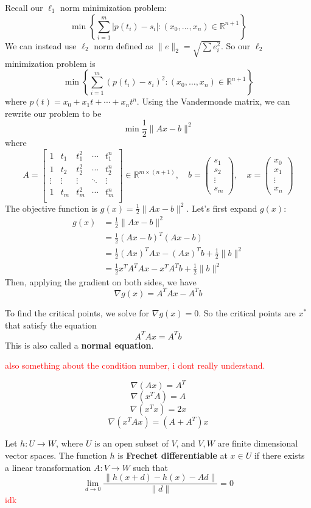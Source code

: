 \begin{problem}
  Recall our $\ell_1$ norm minimization problem:
  $$\min \left\{\sum^m_{i=1}|p(t_i) - s_i| : (x_0,\ldots,x_n) \in \mathbb R^{n+1}\right\}$$
  We can instead use $\ell_2$ norm defined as $\|e\|_2 = \sqrt{\sum e_i^2}$. So our $\ell_2$ minimization problem is $$\min \left\{\sum^m_{i=1}(p(t_i) - s_i)^2 : (x_0,\ldots,x_n) \in \mathbb R^{n+1}\right\}$$ where $p(t) = x_0 + x_1t + \cdots + x_nt^n$. Using the Vandermonde matrix, we can rewrite our problem to be
  $$\min \frac{1}{2} \|Ax - b\|^2$$ where $$A = \begin{bmatrix}
    1 & t_1 & t_1^2 & \cdots & t_1^n\\
    1 & t_2 & t_2^2 & \cdots & t_2^n\\
    \vdots & \vdots & \vdots & \ddots & \vdots\\
    1 & t_m & t_m^2 & \cdots & t_m^n\\
  \end{bmatrix} \in \mathbb R^{m \times (n+1)}, \quad b = \begin{pmatrix}
    s_1 \\ s_2 \\ \vdots \\ s_m
  \end{pmatrix}, \quad x = \begin{pmatrix}
    x_0 \\ x_1 \\ \vdots \\ x_n
  \end{pmatrix}$$
  The objective function is $g(x) = \frac{1}{2}\|Ax - b\|^2$. Let's first expand $g(x)$:
  \begin{align*}
    g(x) &= \frac{1}{2} \|Ax - b \|^2 \\
    &= \frac{1}{2}(Ax - b)^T (Ax - b) \\
    &= \frac{1}{2} (Ax)^T Ax - (Ax)^Tb + \frac{1}{2} \|b \|^2 \\
    &= \frac{1}{2} x^T A^T Ax - x^T A^T b + \frac{1}{2} \|b \|^2 
  \end{align*}
  Then, applying the gradient on both sides, we have $$\nabla g(x) = A^T Ax - A^T b$$
  
  To find the critical points, we solve for $\nabla g(x) = 0$. So the critical points are $x^*$ that satisfy the equation
  $$A^TAx = A^Tb$$
  This is also called a \textbf{normal equation}.

  \textcolor{red}{also something about the condition number, i dont really understand.}
\end{problem}
\begin{theorem}
  $$\nabla (Ax) = A^T$$
  $$\nabla (x^T A) = A$$
  $$\nabla (x^T x) = 2x$$
  $$\nabla (x^T Ax) = (A + A^T)x$$
\end{theorem}
\begin{definition}
  Let $h: U \to W$, where $U$ is an open subset of $V$, and $V,W$ are finite dimensional vector spaces. The function $h$ is \textbf{Frechet differentiable} at $x \in U$ if there exists a linear transformation $A: V \to W$ such that
  $$\lim_{d \rightarrow 0} \frac{\|h(x + d) - h(x) - Ad \|}{\|d\|} = 0$$
  \textcolor{red}{idk}
\end{definition}
